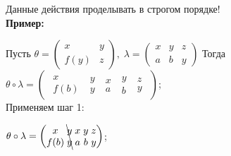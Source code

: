\documentclass[18pt, a4paper]{extarticle}
\newcommand{\primer}{\textbf{Пример:\;}}
\begin{document}
Данные действия проделывать в строгом порядке!\\

\primer

Пусть $\theta=\begin{pmatrix}x & y\\f(y) & z\end{pmatrix},\;\lambda=\begin{pmatrix}x & y & z\\a & b & y\end{pmatrix}$ Тогда \\

$\theta\circ\lambda=\begin{pmatrix}\begin{matrix}x\\f(b)\end{matrix}\;\begin{matrix}y\\y\end{matrix}\;\begin{matrix}x\\a\end{matrix}\;\begin{matrix}y\\b\end{matrix}\;\begin{matrix}z\\y\end{matrix}\end{pmatrix}$;\\

Применяем шаг 1:

$\theta\circ\lambda=\begin{pmatrix}\begin{matrix}x\\f(b)\end{matrix}\;\bcancel{\begin{matrix}y\\y\end{matrix}}\;\begin{matrix}x\\a\end{matrix}\;\begin{matrix}y\\b\end{matrix}\;\begin{matrix}z\\y\end{matrix}\end{pmatrix}$;\\
\end{document}
